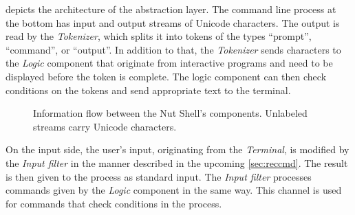 \documentclass[paper=a4,abstract=on,cleardoublepage=empty,numbers=noenddot,toc=bib,12pt,appendixprefix=true]{scrreprt}
\begin{document}
 depicts the architecture of the abstraction layer. The command line process at the bottom has input and output streams of Unicode characters. The output is read by the \emph{Tokenizer}, which splits it into tokens of the types “prompt”, “command”, or “output”. In addition to that, the \emph{Tokenizer} sends characters to the \emph{Logic} component that originate from interactive programs and need to be displayed before the token is complete. The logic component can then check conditions on the tokens and send appropriate text to the terminal.

\begin{figure}[htb]
    \centering
    \caption{Information flow between the Nut Shell's components. Unlabeled streams carry Unicode characters.}
    \label{fig:architecture}
\end{figure}

On the input side, the user's input, originating from the \emph{Terminal}, is modified by the \emph{Input filter} in the manner described in the upcoming \cref{sec:reccmd}. The result is then given to the process as standard input. The \emph{Input filter} processes commands given by the \emph{Logic} component in the same way. This channel is used for commands that check conditions in the process.
\end{document}
